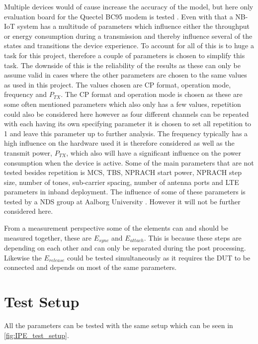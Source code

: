 Multiple devices would of cause increase the accuracy of the model, but here only evaluation board for the Quectel BC95 modem is tested \citep{BC95}. Even with that a \gls{NB-IoT} system has a multitude of parameters which influence either the throughput or energy consumption during a transmission and thereby influence several of the states and transitions the device experience. To account for all of this is to huge a task for this project, therefore a couple of parameters is chosen to simplify this task. The downside of this is the reliability of the results as these can only be assume valid in cases where the other parameters are chosen to the same values as used in this project. The values chosen are CP format, operation mode, frequency and $P_{TX}$. The CP format and operation mode is chosen as these are some often mentioned parameters which also only has a few values, repetition could also be considered here however as four different channels can be repeated with each having its own specifying parameter it is chosen to set all repetition to 1 and leave this parameter up to further analysis. The frequency typically has a high influence on the hardware used it is therefore considered as well as the transmit power, $P_{TX}$, which also will have a significant influence on the power consumption when the device is active. Some of the main parameters that are not tested besides repetition is \gls{MCS}, \gls{TBS}, NPRACH start power, NPRACH step size, number of tones, sub-carrier spacing, number of antenna ports and LTE parameters in inband deployment. The influence of some of these parameters is tested by a NDS group at Aalborg University . However it will not be further considered here.

From a measurement perspective some of the elements can and should be measured together, these are $E_{sync}$ and $E_{attach}$. This is because these steps are depending on each other and can only be separated during the  post processing. Likewise the $E_{release}$ could be tested simultaneously as it requires the DUT to be connected and depends on most of the same parameters.  



\section{Test Setup}
All the parameters can be tested with the same setup which can be seen in \autoref{fig:IPE_test_setup}.

